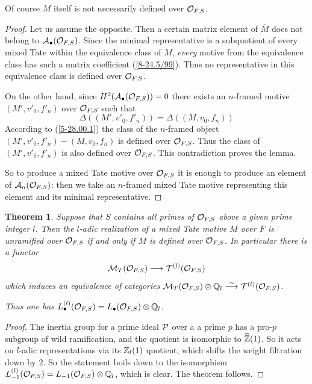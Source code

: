 \documentclass[10pt]{article}
\newtheorem{theorem}{Theorem}[section]
\begin{document}
Of course $M$ itself is not necessarily defined over 
 ${\cal O}_{F, S}$. 

\begin{proof} Let us assume the opposite. Then a certain matrix 
element of $\overline M$ does not belong to ${\cal A}_{\bullet}({\cal O}_{F, S})$. 
Since the minimal representative is a subquotient of every 
mixed Tate within the  equivalence class of $M$, {\it every} 
motive  from the  equivalence class has such a matrix coefficient (\ref{8-24.5/99}). 
Thus no representative in this  equivalence class 
is defined over ${\cal O}_{F, S}$.  

On the other hand, since $H^2({\cal A}_{\bullet}({\cal O}_{F, S}) ) =0$ there exists an $n$-framed motive 
$(M', v'_0, f'_n)$ over 
 ${\cal O}_{F, S}$ such that 
$$
\Delta((M', v'_0, f'_n)) = \Delta((M, v_0, f_n))
$$
According to (\ref{5-28.00.1}) the class of the $n$-framed object $(M', v'_0, f'_n)-(M, v_0, f_n)$ is defined over 
${\cal O}_{F, S}$. Thus the class of $(M', v'_0, f'_n)$ is also defined over ${\cal O}_{F, S}$. This contradiction proves the lemma. 


So to produce a mixed Tate motive over ${\cal O}_{F, S}$ it is enough to produce 
an element of ${\cal A}_{n}({\cal O}_{F, S})$: then we take an $n$-framed mixed Tate motive representing this element and its 
minimal representative. 


\end{proof}

\begin{theorem} \label{8-25.1/99} Suppose that $S$ contains all primes of ${\cal O}_{F, S}$ above a 
given 
prime integer $l$. 
Then the   $l$-adic realization of a mixed Tate motive $M$ over $F$ 
is unramified over ${\cal O}_{F, S}$ if and only if $M$ is defined over ${\cal O}_{F, S}$. 
In particular there is a functor 
$$
{\cal M}_{T}({\cal O}_{F, S}) \longrightarrow {\cal T}^{(l)}({\cal O}_{F, S})
$$
which induces an equivalence of categories $
{\cal M}_{T}({\cal O}_{F, S})\otimes {\mathbb Q}_l 
\stackrel{\sim}{\longrightarrow} {\cal T}^{(l)}({\cal O}_{F, S})
$. 

Thus one has $L_{\bullet}^{(l)}({\cal O}_{F,S}) = 
L_{\bullet}({\cal O}_{F,S})\otimes {\mathbb Q}_l$. 
\end{theorem}

\begin{proof} The inertia group for a prime ideal ${\cal P}$ over a a prime $p$ 
has  a pro-$p$ subgroup of wild ramification, 
and the quotient is isomorphic to $\widehat {{\mathbb Z}}(1)$. So it acts on $l$-adic representations via 
its ${\mathbb Z}_l(1)$ quotient, which shifts the weight filtration down by $2$.  
So the statement boils down to the isomorphism $L_{-1}^{(l)}({\cal O}_{F,S}) = 
L_{-1}({\cal O}_{F,S})\otimes {\mathbb Q}_l$, which is clear.
The theorem follows. 


\end{proof}
\end{document}
